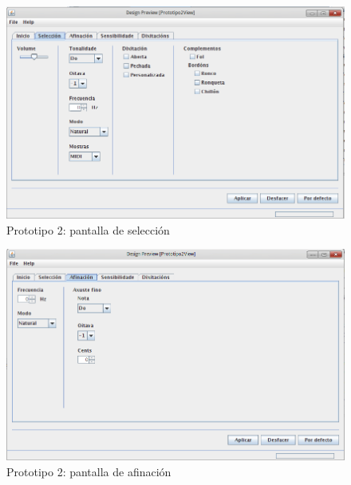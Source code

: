  \begin{figure}[htbp]
  \centering
  \includegraphics[scale=0.6,keepaspectratio=true]{./imagenes/prototipo2_02.png}
  \caption{Prototipo 2: pantalla de selección}
  \label{figura:Prototipo2Seleccion}
 \end{figure}

 \begin{figure}[htbp]
  \centering
  \includegraphics[scale=0.6,keepaspectratio=true]{./imagenes/prototipo2_03.png}
  \caption{Prototipo 2: pantalla de afinación}
  \label{figura:Prototipo2Afinacion}
 \end{figure}

